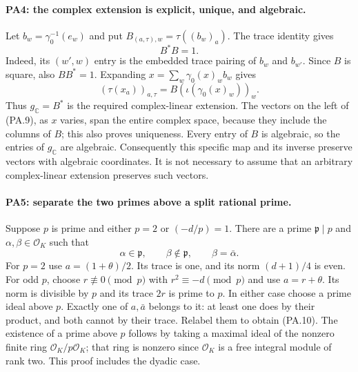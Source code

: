\paragraph{PA4: the complex extension is explicit, unique, and algebraic.}
Let $b_w=\gamma_0^{-1}(e_w)$ and put
$B_{(a,\tau),w}=\tau((b_w)_a)$. The trace identity gives
\[
                         B^*B=1.
                                                               \tag{PA.8}
\]
Indeed, its $(w',w)$ entry is the embedded trace pairing of
$b_w$ and $b_{w'}$. Since $B$ is square, also $BB^*=1$.
Expanding $x=\sum_w\gamma_0(x)_w b_w$ gives
\[
 (\tau(x_a))_{a,\tau}=B(\iota(\gamma_0(x)_w))_w.
                                                               \tag{PA.9}
\]
Thus $g_{\mathbb C}=B^*$ is the required complex-linear extension.
The vectors on the left of (PA.9), as $x$ varies, span the entire
complex space, because they include the columns of $B$; this also
proves uniqueness. Every entry of $B$ is algebraic, so the entries
of $g_{\mathbb C}$ are algebraic. Consequently this specific map
and its inverse preserve vectors with algebraic coordinates.
It is not necessary to assume that an arbitrary complex-linear
extension preserves such vectors.

\paragraph{PA5: separate the two primes above a split rational prime.}
Suppose $p$ is prime and either $p=2$ or $(-d/p)=1$.
There are a prime $\mathfrak p\mid p$ and $\alpha,\beta\in\mathcal O_K$
such that
\[
 \alpha\in\mathfrak p,\qquad \beta\notin\mathfrak p,
 \qquad \beta=\bar\alpha.                                    \tag{PA.10}
\]
For $p=2$ use $a=(1+\theta)/2$. Its trace is one, and its norm
$(d+1)/4$ is even. For odd $p$, choose $r\not\equiv0\pmod p$
with $r^2\equiv-d\pmod p$ and use $a=r+\theta$. Its norm is
divisible by $p$ and its trace $2r$ is prime to $p$.
In either case choose a prime ideal above $p$. Exactly one of
$a,\bar a$ belongs to it: at least one does by their product,
and both cannot by their trace. Relabel them to obtain (PA.10).
The existence of a prime above $p$ follows by taking a maximal
ideal of the nonzero finite ring $\mathcal O_K/p\mathcal O_K$;
that ring is nonzero since $\mathcal O_K$ is a free integral
module of rank two. This proof includes the dyadic case.

